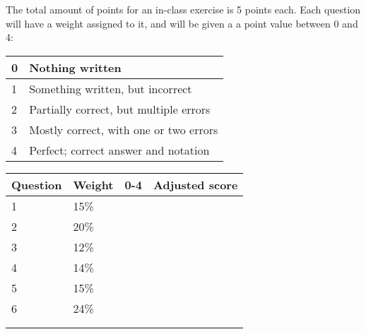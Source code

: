 \documentclass[a4paper,12pt]{book}
\begin{document}
        The total amount of points for an in-class exercise is 5 points each.
        Each question will have a weight assigned to it, and will be given
        a a point value between 0 and 4:

    \begin{center}
        \begin{tabular}{ | l | l | }
            \hline
            0 & Nothing written \\ \hline
            1 & Something written, but incorrect \\ \hline
            2 & Partially correct, but multiple errors \\ \hline
            3 & Mostly correct, with one or two errors \\ \hline
            4 & Perfect; correct answer and notation \\ \hline

        \end{tabular}
    \end{center}

    \begin{center}

        \begin{tabular}{ | l | l | l | l | }
            \hline
            \textbf{ Question } & \textbf{ Weight } & \textbf{ 0-4 } & \textbf{ Adjusted score }
            \\ \hline

            1 & 15\% & &    \\ \hline
            2 & 20\% & &    \\ \hline
            3 & 12\% & &    \\ \hline
            4 & 14\% & &    \\ \hline
            5 & 15\% & &    \\ \hline
            6 & 24\% & &    \\ \hline
            & & & \\ \hline
            & & & \\ \hline


        \end{tabular}
    \end{center}


\end{document}

